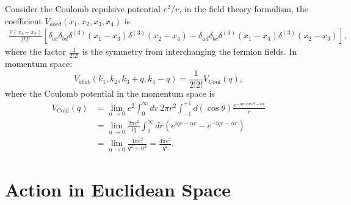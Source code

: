 Consider the Coulomb repulsive potential $e^2/r$, in the field theory formalism, the coefficient $V_{abcd}(x_1,x_2,x_3,x_4)$ is
\begin{equation}
\begin{aligned}
	\frac{V(x_1-x_2)}{2!2!}\left[\delta_{ac}\delta_{bd}\delta^{(3)}(x_1-x_3)\delta^{(3)}(x_2-x_4) - \delta_{ad}\delta_{bc}\delta^{(3)}(x_1-x_4)\delta^{(3)}(x_2-x_3)\right],
\end{aligned}
\end{equation}
where the factor $\frac{1}{2!2!}$ is the symmetry from interchanging the fermion fields.
In momentum space:
\begin{equation}
	V_{abab}(k_1,k_2,k_3+q,k_4-q) = \frac{1}{2!2!} V_{\mathrm{Coul}}(q),
\end{equation}
where the Coulomb potential in the momentum space is
\begin{equation}
\begin{aligned}
	V_{\mathrm{Coul}}(q) 
	&=  \lim_{\alpha\rightarrow0}e^{2}\int_{0}^{\infty}dr\ 2\pi r^{2} \int_{-1}^{+1}d\left(\cos\theta\right)\frac{e^{-iqr\cos\theta-\alpha r}}{r} \\
	&=  \lim_{\alpha\rightarrow0}\frac{2\pi e^{2}}{iq}\int_{0}^{\infty}dr\left(e^{iqr-\alpha r}-e^{-iqr-\alpha r}\right)\\
 	&=  \lim_{\alpha\rightarrow0}\frac{4\pi e^{2}}{q^{2}+\alpha^{2}}
	=  \frac{4\pi e^{2}}{q^{2}}.
\end{aligned}
\end{equation}



\section{Action in Euclidean Space}


